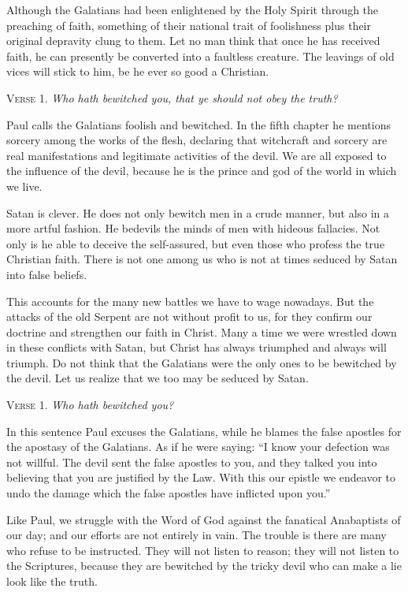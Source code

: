 Although the Galatians had been enlightened by the Holy Spirit through the preaching of faith, something of their national trait of foolishness plus their original depravity clung to them. Let no man think that once he has received faith, he can presently be converted into a faultless creature. The leavings of old vices will stick to him, be he ever so good a Christian.

\textsc{Verse} 1. \emph{Who hath bewitched you, that ye should not obey the truth?}

Paul calls the Galatians foolish and bewitched. In the fifth chapter he mentions sorcery among the works of the flesh, declaring that witchcraft and sorcery are real manifestations and legitimate activities of the devil. We are all exposed to the influence of the devil, because he is the prince and god of the world in which we live.

Satan is clever. He does not only bewitch men in a crude manner, but also in a more artful fashion. He bedevils the minds of men with hideous fallacies. Not only is he able to deceive the self-assured, but even those who profess the true Christian faith. There is not one among us who is not at times seduced by Satan into false beliefs.

This accounts for the many new battles we have to wage nowadays. But the attacks of the old Serpent are not without profit to us, for they confirm our doctrine and strengthen our faith in Christ. Many a time we were wrestled down in these conflicts with Satan, but Christ has always triumphed and always will triumph. Do not think that the Galatians were the only ones to be bewitched by the devil. Let us realize that we too may be seduced by Satan.

\textsc{Verse} 1. \emph{Who hath bewitched you?}

In this sentence Paul excuses the Galatians, while he blames the false apostles for the apostasy of the Galatians. As if he were saying: “I know your defection was not willful. The devil sent the false apostles to you, and they talked you into believing that you are justified by the Law. With this our epistle we endeavor to undo the damage which the false apostles have inflicted upon you.”

Like Paul, we struggle with the Word of God against the fanatical Anabaptists of our day; and our efforts are not entirely in vain. The trouble is there are many who refuse to be instructed. They will not listen to reason; they will not listen to the Scriptures, because they are bewitched by the tricky devil who can make a lie look like the truth.

